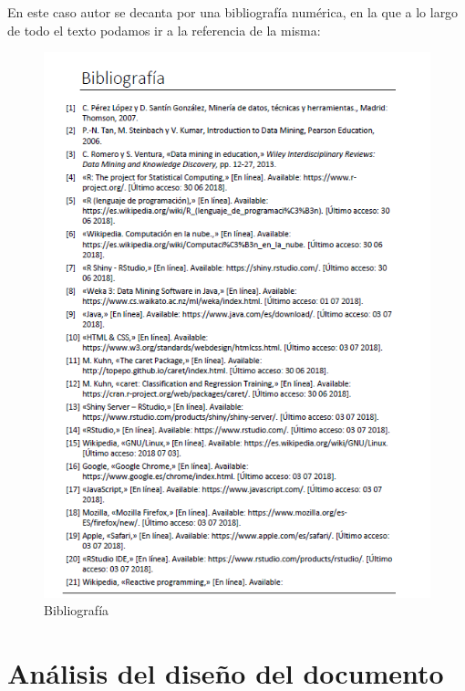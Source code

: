 En este caso autor se decanta por una bibliografía numérica, en la que a lo largo de todo el texto podamos ir a la referencia de la misma:
\begin{center}
    \begin{figure}[H]
  \includegraphics[scale=0.5]{capitulos/img/img6.PNG}
  \caption{Bibliografía}
  \label{fig:img6}
\end{figure}

\end{center}



\chapter{Análisis del diseño del documento}

